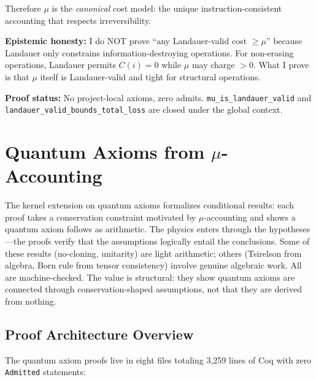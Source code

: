 Therefore $\mu$ is the \textit{canonical} cost model: the unique instruction-consistent accounting that respects irreversibility.

\textbf{Epistemic honesty:} I do NOT prove ``any Landauer-valid cost $\geq \mu$'' because Landauer only constrains information-destroying operations. For non-erasing operations, Landauer permits $C(i) = 0$ while $\mu$ may charge $> 0$. What I prove is that $\mu$ itself is Landauer-valid and tight for structural operations.

\textbf{Proof status:} No project-local axioms, zero admits. \texttt{mu\_is\_landauer\_valid} and \texttt{landauer\_valid\_bounds\_total\_loss} are closed under the global context.

\section{Quantum Axioms from $\mu$-Accounting}

The kernel extension on quantum axioms formalizes conditional results: each proof takes a conservation constraint motivated by $\mu$-accounting and shows a quantum axiom follows as arithmetic. The physics enters through the hypotheses---the proofs verify that the assumptions logically entail the conclusions. Some of these results (no-cloning, unitarity) are light arithmetic; others (Tsirelson from algebra, Born rule from tensor consistency) involve genuine algebraic work. All are machine-checked. The value is structural: they show quantum axioms are connected through conservation-shaped assumptions, not that they are derived from nothing.

\subsection{Proof Architecture Overview}

The quantum axiom proofs live in eight files totaling 3,259 lines of Coq with zero \texttt{Admitted} statements:

